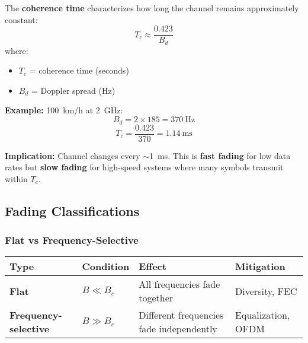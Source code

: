 The \textbf{coherence time} characterizes how long the channel remains approximately constant:
\begin{equation}
T_c \approx \frac{0.423}{B_d}
\end{equation}
where:
\begin{itemize}
\item $T_c$ = coherence time (seconds)
\item $B_d$ = Doppler spread (Hz)
\end{itemize}

\textbf{Example:} 100~km/h at 2~GHz:
\begin{equation}
B_d = 2 \times 185 = 370~\text{Hz}
\end{equation}
\begin{equation}
T_c = \frac{0.423}{370} = 1.14~\text{ms}
\end{equation}

\textbf{Implication:} Channel changes every $\sim$1~ms. This is \textbf{fast fading} for low data rates but \textbf{slow fading} for high-speed systems where many symbols transmit within $T_c$.

\subsection{Fading Classifications}\label{fading-classifications}

\subsubsection{Flat vs Frequency-Selective}\label{flat-vs-frequency-selective}

{\def\LTcaptype{} %
\begin{longtable}[]{@{}
  >{\raggedright\arraybackslash}p{}
  >{\raggedright\arraybackslash}p{}
  >{\raggedright\arraybackslash}p{}
  >{\raggedright\arraybackslash}p{}@{}}
\toprule\noalign{}
\begin{minipage}[b]{\linewidth}\raggedright
Type
\end{minipage} & \begin{minipage}[b]{\linewidth}\raggedright
Condition
\end{minipage} & \begin{minipage}[b]{\linewidth}\raggedright
Effect
\end{minipage} & \begin{minipage}[b]{\linewidth}\raggedright
Mitigation
\end{minipage} \\
\midrule\noalign{}
\endhead
\bottomrule\noalign{}
\endlastfoot
\textbf{Flat} & \(B \ll B_c\) & All frequencies fade together &
Diversity, FEC \\
\textbf{Frequency-selective} & \(B \gg B_c\) & Different frequencies
fade independently & Equalization, OFDM \\
\end{longtable}
}

